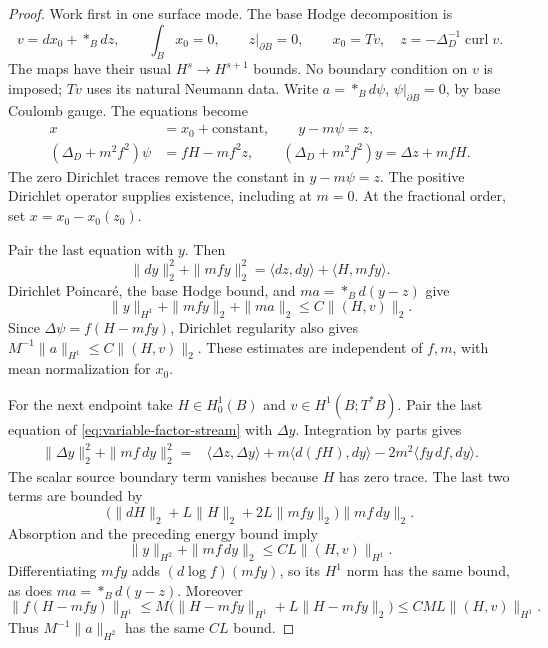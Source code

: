 \documentclass[11pt]{amsart}
\theoremstyle{definition}
\theoremstyle{remark}
\theoremstyle{plain}
\begin{document}
\begin{proof}
Work first in one surface mode. The base Hodge decomposition is
\[
 v=dx_0+*_Bdz,\qquad \int_Bx_0=0,\qquad z|_{\partial B}=0,
 \qquad x_0=Tv,\quad z=-\Delta_D^{-1}\operatorname{curl}v.
\]
The maps have their usual $H^s\to H^{s+1}$ bounds. No boundary
condition on $v$ is imposed; $Tv$ uses its natural Neumann data.
Write $a=*_Bd\psi$, $\psi|_{\partial B}=0$, by base Coulomb
gauge. The equations become
\begin{equation}\label{eq:variable-factor-stream}
 \begin{split}
 x&=x_0+\text{constant},\qquad y-m\psi=z,\\
 (\Delta_D+m^2f^2)\psi&=fH-mf^2z,\qquad
 (\Delta_D+m^2f^2)y=\Delta z+mfH.
 \end{split}
\end{equation}
The zero Dirichlet traces remove the constant in $y-m\psi=z$.
The positive Dirichlet operator supplies existence, including at
$m=0$. At the fractional order, set $x=x_0-x_0(z_0)$.

Pair the last equation with $y$. Then
\begin{equation}\label{eq:variable-factor-energy}
 \|dy\|_2^2+\|mf y\|_2^2
 =\langle dz,dy\rangle+\langle H,mf y\rangle.
\end{equation}
Dirichlet Poincar\'e, the base Hodge bound, and
$ma=*_Bd(y-z)$ give
\[
 \|y\|_{H^1}+\|mf y\|_2+\|ma\|_2\leq C\|(H,v)\|_2.
\]
Since $\Delta\psi=f(H-mf y)$, Dirichlet regularity also gives
$M^{-1}\|a\|_{H^1}\leq C\|(H,v)\|_2$. These estimates are
independent of $f,m$, with mean normalization for $x_0$.

For the next endpoint take $H\in H^1_0(B)$ and $v\in H^1(B;T^*B)$.
Pair the last equation of \eqref{eq:variable-factor-stream} with
$\Delta y$. Integration by parts gives
\begin{equation}\label{eq:variable-factor-differentiated-energy}
 \begin{split}
 \|\Delta y\|_2^2+\|mf\,dy\|_2^2
 ={}&\langle\Delta z,\Delta y\rangle
       +m\langle d(fH),dy\rangle
       -2m^2\langle fy\,df,dy\rangle.
 \end{split}
\end{equation}
The scalar source boundary term vanishes because $H$ has zero
trace. The last two terms are bounded by
\[
 \bigl(\|dH\|_2+L\|H\|_2+2L\|mf y\|_2\bigr)\|mf\,dy\|_2.
\]
Absorption and the preceding energy bound imply
\[
 \|y\|_{H^2}+\|mf\,dy\|_2\leq CL\|(H,v)\|_{H^1}.
\]
Differentiating $mf y$ adds $(d\log f)(mf y)$, so its $H^1$
norm has the same bound, as does $ma=*_Bd(y-z)$. Moreover
\[
 \|f(H-mf y)\|_{H^1}
 \leq M\bigl(\|H-mf y\|_{H^1}+L\|H-mf y\|_2\bigr)
 \leq CML\|(H,v)\|_{H^1}.
\]
Thus $M^{-1}\|a\|_{H^2}$ has the same $CL$ bound.


\end{proof}
\end{document}
